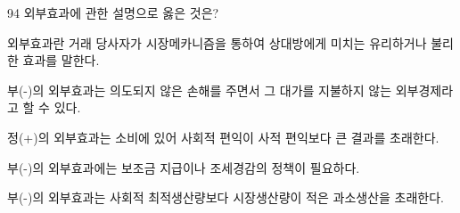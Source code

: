 \begin{question}{94}
외부효과에 관한 설명으로 옳은 것은?
\begin{choices}
  \item 외부효과란 거래 당사자가 시장메카니즘을 통하여 상대방에게 미치는 유리하거나 불리한 효과를 말한다.
  \item 부(-)의 외부효과는 의도되지 않은 손해를 주면서 그 대가를 지불하지 않는 외부경제라고 할 수 있다.
  \item 정(+)의 외부효과는 소비에 있어 사회적 편익이 사적 편익보다 큰 결과를 초래한다.
  \item 부(-)의 외부효과에는 보조금 지급이나 조세경감의 정책이 필요하다.
  \item 부(-)의 외부효과는 사회적 최적생산량보다 시장생산량이 적은 과소생산을 초래한다.
\end{choices}
\end{question}
